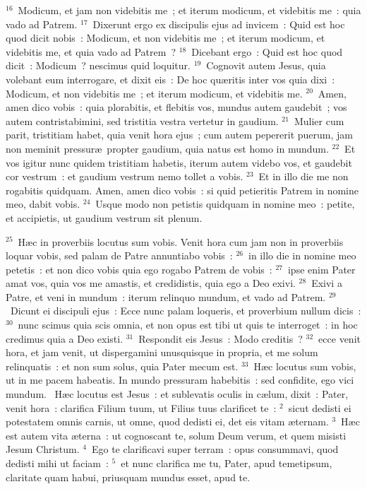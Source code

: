 ${}^{16}$~Modicum, et jam non videbitis me~; et iterum modicum, et videbitis me~: quia vado ad Patrem.
${}^{17}$~Dixerunt ergo ex discipulis ejus ad invicem~: Quid est hoc quod dicit nobis~: Modicum, et non videbitis me~; et iterum modicum, et videbitis me, et quia vado ad Patrem~?
${}^{18}$~Dicebant ergo~: Quid est hoc quod dicit~: Modicum~? nescimus quid loquitur.
${}^{19}$~Cognovit autem Jesus, quia volebant eum interrogare, et dixit eis~: De hoc qu\ae ritis inter vos quia dixi~: Modicum, et non videbitis me~; et iterum modicum, et videbitis me.
${}^{20}$~Amen, amen dico vobis~: quia plorabitis, et flebitis vos, mundus autem gaudebit~; vos autem contristabimini, sed tristitia vestra vertetur in gaudium.
${}^{21}$~Mulier cum parit, tristitiam habet, quia venit hora ejus~; cum autem pepererit puerum, jam non meminit pressur\ae\ propter gaudium, quia natus est homo in mundum.
${}^{22}$~Et vos igitur nunc quidem tristitiam habetis, iterum autem videbo vos, et gaudebit cor vestrum~: et gaudium vestrum nemo tollet a vobis.
${}^{23}$~Et in illo die me non rogabitis quidquam. Amen, amen dico vobis~: si quid petieritis Patrem in nomine meo, dabit vobis.
${}^{24}$~Usque modo non petistis quidquam in nomine meo~: petite, et accipietis, ut gaudium vestrum sit plenum.


${}^{25}$~H\ae c in proverbiis locutus sum vobis. Venit hora cum jam non in proverbiis loquar vobis, sed palam de Patre annuntiabo vobis~:
${}^{26}$~in illo die in nomine meo petetis~: et non dico vobis quia ego rogabo Patrem de vobis~:
${}^{27}$~ipse enim Pater amat vos, quia vos me amastis, et credidistis, quia ego a Deo exivi.
${}^{28}$~Exivi a Patre, et veni in mundum~: iterum relinquo mundum, et vado ad Patrem.
${}^{29}$~Dicunt ei discipuli ejus~: Ecce nunc palam loqueris, et proverbium nullum dicis~:
${}^{30}$~nunc scimus quia scis omnia, et non opus est tibi ut quis te interroget~: in hoc credimus quia a Deo existi.
${}^{31}$~Respondit eis Jesus~: Modo creditis~?
${}^{32}$~ecce venit hora, et jam venit, ut dispergamini unusquisque in propria, et me solum relinquatis~: et non sum solus, quia Pater mecum est.
${}^{33}$~H\ae c locutus sum vobis, ut in me pacem habeatis. In mundo pressuram habebitis~: sed confidite, ego vici mundum.
~H\ae c locutus est Jesus~: et sublevatis oculis in c\ae lum, dixit~: Pater, venit hora~: clarifica Filium tuum, ut Filius tuus clarificet te~:
${}^{2}$~sicut dedisti ei potestatem omnis carnis, ut omne, quod dedisti ei, det eis vitam \ae ternam.
${}^{3}$~H\ae c est autem vita \ae terna~: ut cognoscant te, solum Deum verum, et quem misisti Jesum Christum.
${}^{4}$~Ego te clarificavi super terram~: opus consummavi, quod dedisti mihi ut faciam~:
${}^{5}$~et nunc clarifica me tu, Pater, apud temetipsum, claritate quam habui, priusquam mundus esset, apud te.


